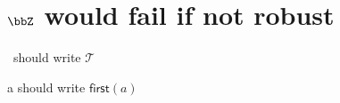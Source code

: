 \documentclass{article}
\begin{document}
\section{\protect\(\bbZ\protect\) would fail if not robust}

\calT\ should write $\mathcal T$

\first a should write $\mathsf{first}(a)$
\end{document}

